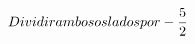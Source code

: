 \documentclass[preview]{standalone}
\begin{document}
\begin{align*}
\special{dvisvgm:raw <g id='unique000'>}Dividir ambos os lados por - \frac{5}{2}\special{dvisvgm:raw </g>}
\end{align*}
\end{document}
